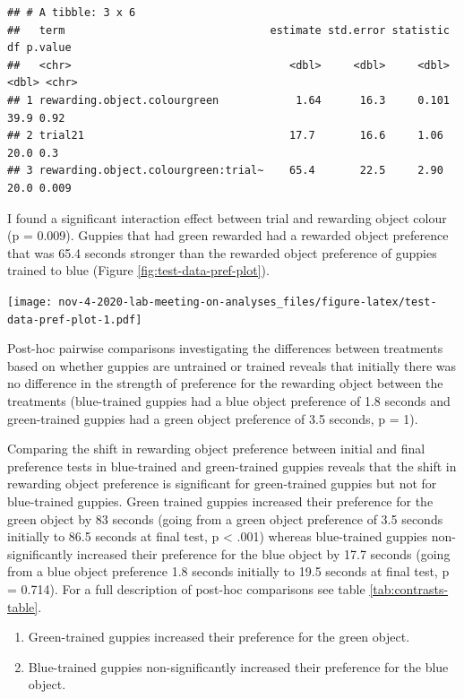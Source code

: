 \documentclass[]{book}
\providecommand{\tightlist}{%
  \setlength{\itemsep}{0pt}\setlength{\parskip}{0pt}}
\begin{document}
\begin{verbatim}
## # A tibble: 3 x 6
##   term                                estimate std.error statistic    df p.value
##   <chr>                                  <dbl>     <dbl>     <dbl> <dbl> <chr>  
## 1 rewarding.object.colourgreen            1.64      16.3     0.101  39.9 0.92   
## 2 trial21                                17.7       16.6     1.06   20.0 0.3    
## 3 rewarding.object.colourgreen:trial~    65.4       22.5     2.90   20.0 0.009
\end{verbatim}

I found a significant interaction effect between trial and rewarding
object colour (p = 0.009). Guppies that had green rewarded had a
rewarded object preference that was 65.4 seconds stronger than the
rewarded object preference of guppies trained to blue (Figure
\ref{fig:test-data-pref-plot}).

\texttt{[image: nov-4-2020-lab-meeting-on-analyses\_files/figure-latex/test-data-pref-plot-1.pdf]}

Post-hoc pairwise comparisons investigating the differences between
treatments based on whether guppies are untrained or trained reveals
that initially there was no difference in the strength of preference for
the rewarding object between the treatments (blue-trained guppies had a
blue object preference of 1.8 seconds and green-trained guppies had a
green object preference of 3.5 seconds, p = 1).

Comparing the shift in rewarding object preference between initial and
final preference tests in blue-trained and green-trained guppies reveals
that the shift in rewarding object preference is significant for
green-trained guppies but not for blue-trained guppies. Green trained
guppies increased their preference for the green object by 83 seconds
(going from a green object preference of 3.5 seconds initially to 86.5
seconds at final test, p \textless{} .001) whereas blue-trained guppies
non-significantly increased their preference for the blue object by 17.7
seconds (going from a blue object preference 1.8 seconds initially to
19.5 seconds at final test, p = 0.714). For a full description of
post-hoc comparisons see table \ref{tab:contrasts-table}.

\begin{enumerate}
\def\labelenumi{\arabic{enumi}.}
\tightlist
\item
  Green-trained guppies increased their preference for the green object.
\item
  Blue-trained guppies non-significantly increased their preference for
  the blue object. 
\end{enumerate}
\end{document}
